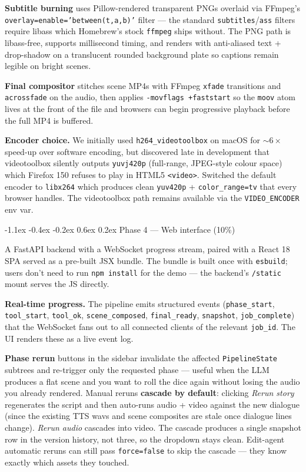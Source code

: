 \documentclass[11pt,a4paper]{article}
\makeatletter
\renewcommand\subsection{\@startsection{subsection}{2}{\z@}%
   {-1.1ex \@plus -0.4ex \@minus -0.2ex}%
   {0.6ex \@plus 0.2ex}%
   {\large\bfseries\color{accent!85!black}}}
\newcommand{\code}[1]{\texttt{\small #1}}
\makeatother
\begin{document}
\textbf{Subtitle burning} uses Pillow-rendered transparent PNGs overlaid via
FFmpeg's \code{overlay=enable='between(t,a,b)'} filter --- the standard
\code{subtitles}/\code{ass} filters require libass which Homebrew's stock
\code{ffmpeg} ships without. The PNG path is libass-free, supports millisecond
timing, and renders with anti-aliased text + drop-shadow on a translucent
rounded background plate so captions remain legible on bright scenes.

\textbf{Final compositor} stitches scene MP4s with FFmpeg \code{xfade}
transitions and \code{acrossfade} on the audio, then applies
\code{-movflags +faststart} so the \code{moov} atom lives at the front of the
file and browsers can begin progressive playback before the full MP4 is
buffered.

\textbf{Encoder choice.} We initially used \code{h264\_videotoolbox} on macOS
for $\sim$6\,$\times$ speed-up over software encoding, but discovered late in
development that videotoolbox silently outputs \code{yuvj420p} (full-range,
JPEG-style colour space) which Firefox 150 refuses to play in HTML5
\code{<video>}. Switched the default encoder to \code{libx264} which produces
clean \code{yuv420p} + \code{color\_range=tv} that every browser handles. The
videotoolbox path remains available via the \code{VIDEO\_ENCODER} env var.

\subsection{Phase 4 --- Web interface (10\%)}

A FastAPI backend with a WebSocket progress stream, paired with a React 18 SPA
served as a pre-built JSX bundle. The bundle is built once with
\code{esbuild}; users don't need to run \code{npm install} for the demo --- the
backend's \code{/static} mount serves the JS directly.

\textbf{Real-time progress.} The pipeline emits structured events
(\code{phase\_start}, \code{tool\_start}, \code{tool\_ok}, \code{scene\_composed},
\code{final\_ready}, \code{snapshot}, \code{job\_complete}) that the WebSocket
fans out to all connected clients of the relevant \code{job\_id}. The UI
renders these as a live event log.

\textbf{Phase rerun} buttons in the sidebar invalidate the affected
\code{PipelineState} subtrees and re-trigger only the requested phase ---
useful when the LLM produces a flat scene and you want to roll the dice again
without losing the audio you already rendered. Manual reruns
\textbf{cascade by default}: clicking \emph{Rerun story} regenerates the
script and then auto-runs audio + video against the new dialogue (since the
existing TTS wavs and scene composites are stale once dialogue lines change).
\emph{Rerun audio} cascades into video. The cascade produces a single snapshot
row in the version history, not three, so the dropdown stays clean. Edit-agent
automatic reruns can still pass \code{force=false} to skip the cascade --- they
know exactly which assets they touched.
\end{document}
